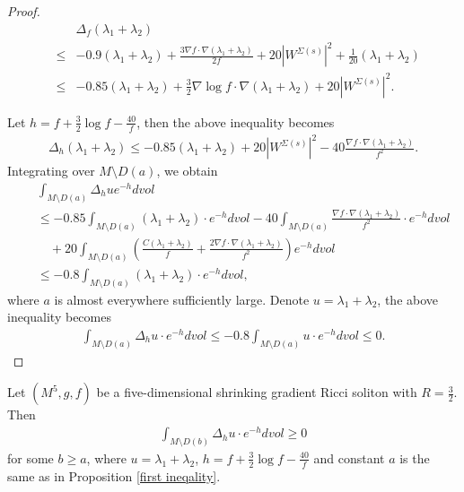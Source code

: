 \documentclass[12pt]{amsart}
\newcommand{\ban}{\begin{eqnarray*}}
\newcommand{\ean}{\end{eqnarray*}}
\begin{document}
\begin{proof}
\ban
	&&\Delta_f(\lambda_1+\lambda_2)\\
	&\leq&-0.9(\lambda_1+\lambda_2)+{\frac{3\nabla f\cdot \nabla(\lambda_1+\lambda_2)}{2f}}
	+20 |W^{\Sigma(s)}|^2
	+{\frac{1}{20}} (\lambda_1+\lambda_2)\\
	&\leq&-0.85(\lambda_1+\lambda_2)+\frac{3}{2}\nabla  \log f\cdot \nabla(\lambda_1+\lambda_2)+20 |W^{\Sigma(s)}|^2.
	\ean
	

Let $h=f+\frac{3}{2}\log f-\frac{40}{f}$, then the above inequality becomes
\ban
\Delta_h (\lambda_1+\lambda_2)\leq -0.85(\lambda_1+\lambda_2)+20 |W^{\Sigma(s)}|^2-40\frac{\nabla f\cdot\nabla(\lambda_1+\lambda_2)}{f^2}.
\ean
Integrating over $M\setminus D(a)$, we obtain
	\ban
	&&\int_{M\setminus D(a)}\Delta_h ue^{-h}dvol\\
	&&\leq-0.85\int_{M\setminus D(a)}(\lambda_1+\lambda_2)\cdot e^{-h}dvol-40\int_{M\setminus D(a)}\frac{\nabla f\cdot\nabla(\lambda_1+\lambda_2)}{f^2}\cdot e^{-h}dvol\\
&&\quad +20\int_{M\setminus D(a)}  \left(\frac{C(\lambda_1+\lambda_2)}{f}+\frac{2\nabla f\cdot\nabla(\lambda_1+\lambda_2)}{f^2}\right) e^{-h}dvol\\
&&\leq -0.8\int_{M\setminus D(a)}(\lambda_1+\lambda_2)\cdot e^{-h}dvol,
	\ean
where $a$ is almost everywhere sufficiently large.	Denote $u=\lambda_1+\lambda_2$,
	the above inequality becomes
	\ban
	\int_{M\setminus D(a)} \Delta_h u\cdot e^{-h}dvol
	\leq -0.8\int_{M\setminus D(a)}u\cdot e^{-h} dvol \leq  0.
	\ean
	
	
\end{proof}



\begin{prop}\label{other direction}
	Let $(M^5, g, f)$ be a five-dimensional shrinking gradient Ricci soliton with $R=\frac{3}{2}$. Then
	\ban
	\int_{M\setminus D(b)} \Delta_h u\cdot e^{-h}dvol\geq 0
	\ean
	for some $b\geq a$, where $u=\lambda_1+\lambda_2$, $h=f+\frac{3}{2}\log f-\frac{40}{f}$ and constant $a$ is the same as in Proposition \ref{first ineqality}.
\end{prop}
\end{document}
